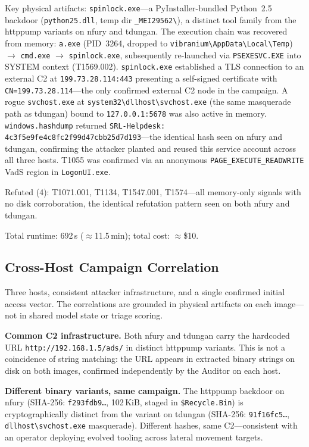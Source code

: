 \documentclass[sigconf, nonacm]{acmart}
\begin{document}
Key physical artifacts: \texttt{spinlock.exe}---a PyInstaller-bundled
Python~2.5 backdoor (\texttt{python25.dll}, temp dir
\texttt{\_MEI29562\textbackslash}), a distinct tool family from the
httppump variants on nfury and tdungan. The execution chain was
recovered from memory: \texttt{a.exe} (PID~3264, dropped to
\texttt{vibranium\textbackslash AppData\textbackslash Local\textbackslash Temp})
$\to$ \texttt{cmd.exe} $\to$ \texttt{spinlock.exe}, subsequently
re-launched via \texttt{PSEXESVC.EXE} into SYSTEM context (T1569.002).
\texttt{spinlock.exe} established a TLS connection to an external C2
at \texttt{199.73.28.114:443} presenting a self-signed certificate with
\texttt{CN=199.73.28.114}---the only confirmed external C2 node in the
campaign. A rogue \texttt{svchost.exe} at
\texttt{system32\textbackslash dllhost\textbackslash svchost.exe}
(the same masquerade path as tdungan) bound to
\texttt{127.0.0.1:5678} was also active in memory.
\texttt{windows.hashdump} returned
\texttt{SRL-Helpdesk: 4c3f5e9fe4c8fc2f99d47cbb25d7d193}---the
identical hash seen on nfury and tdungan, confirming the attacker
planted and reused this service account across all three hosts.
T1055 was confirmed via an anonymous \texttt{PAGE\_EXECUTE\_READWRITE}
VadS region in \texttt{LogonUI.exe}.

Refuted (4): T1071.001, T1134, T1547.001, T1574---all memory-only
signals with no disk corroboration, the identical refutation pattern
seen on both nfury and tdungan.

Total runtime: 692\,s ($\approx$11.5\,min); total cost: $\approx$\$10.

\subsection{Cross-Host Campaign Correlation}
\label{sec:campaign}

Three hosts, consistent attacker infrastructure, and a single confirmed
initial access vector. The correlations are grounded in physical
artifacts on each image---not in shared model state or triage scoring.

\textbf{Common C2 infrastructure.} Both nfury and tdungan carry the
hardcoded URL \texttt{http://192.168.1.5/ads/} in distinct httppump
variants. This is not a coincidence of string matching: the URL
appears in extracted binary strings on disk on both images, confirmed
independently by the Auditor on each host.

\textbf{Different binary variants, same campaign.}
The httppump backdoor on nfury (SHA-256: \texttt{f293fdb9\ldots},
102\,KiB, staged in \texttt{\$Recycle.Bin}) is cryptographically
distinct from the variant on tdungan (SHA-256: \texttt{91f16fc5\ldots},
\texttt{dllhost\textbackslash svchost.exe} masquerade). Different
hashes, same C2---consistent with an operator deploying evolved
tooling across lateral movement targets.
\end{document}
